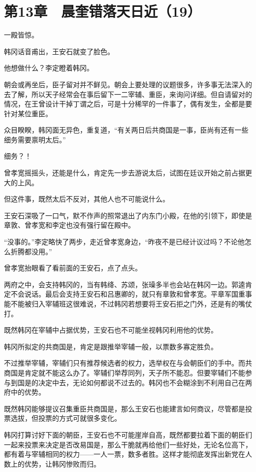 \section{第13章　晨奎错落天日近（19）}

一殿皆惊。

韩冈话音甫出，王安石就变了脸色。

他想做什么？李定瞪着韩冈。

朝会或再坐后，臣子留对并不鲜见。朝会上要处理的议题很多，许多事无法深入的去了解，所以天子经常会在事后留下一二宰辅、重臣，来询问详细。但自请留对的情况，在王曾设计干掉丁谓之后，可是十分稀罕的一件事了，偶有发生，全都是要针对某位重臣。

众目睽睽，韩冈面无异色，重复道，“有关两日后共商国是一事，臣尚有还有一些细务需要禀明太后。”

细务？！

曾孝宽摇摇头，还能是什么，肯定先一步去游说太后，试图在廷议开始之前占据更大的上风。

但这件事，既然太后不反对，其他人也不可能说什么。

王安石深吸了一口气，默不作声的照常退出了内东门小殿，在他的引领下，即使是章敦、曾孝宽和李定也没有强行留在殿中。

“没事的。”李定略快了两步，走近曾孝宽身边，“昨夜不是已经计议过吗？不论他怎么折腾都没用。”

曾孝宽抬眼看了看前面的王安石，点了点头。

两府之中，会支持韩冈的，当有韩绛、苏颂，张璪多半也会站在韩冈一边。郭逵肯定不会说话。最后会支持王安石和吕惠卿的，就只有章敦和曾孝宽。平章军国重事能不能被归入宰辅班这很难说，不过韩冈若想要将王安石拒之门外，还是有的嘴仗打。

既然韩冈在宰辅中占据优势，王安石也不可能坐视韩冈利用他的优势。

韩冈所拟定的共商国是，肯定是跟推举宰辅一般，以票数多寡定胜负。

不过推举宰辅，宰辅们只有推荐候选者的权力，选举权在与会朝臣们的手中。而共商国是肯定就不能这么办了。宰辅们举荐同列，天子所不能忍。但要宰辅们不能参与到国是的决定中去，无论如何都说不过去的。韩冈也不会糊涂到不利用自己在两府中的优势。

既然韩冈能够提议召集重臣共商国是，那么王安石也能建言如何商议，尽管都是投票选拔，但投票的方式可就很多变化。

韩冈打算讨好下面的朝臣，王安石也不可能崖岸自高，既然都要拉着下面的朝臣们一起来投票来决定是否改易国是，那么干脆就再给他们一些好处，无论名位高下，都有着与宰辅相同的权力——一人一票，数多者胜。这样才能彻底发挥出新党在人数上的优势，让韩冈惨败而归。

